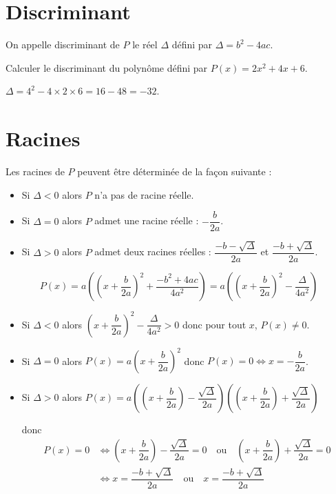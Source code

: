 \documentclass[french]{book}
\begin{document}
\section{Discriminant}
\begin{defn}
On appelle discriminant de $P$ le réel $\Delta$ défini par $\Delta=b^{2}-4ac$.
\vspace{5mm}
\end{defn}

\begin{exemple}
Calculer le discriminant du polynôme défini par $P(x)=2x^{2}+4x+6$.
\end{exemple}


$\Delta=4^{2}-4\times 2\times 6=16-48=-32$.


\section{Racines}
\begin{prop}
Les racines de $P$ peuvent être déterminée de la façon suivante :
\begin{itemize}
\item Si $\Delta<0$ alors $P$ n'a pas de racine réelle.
\item Si $\Delta=0$ alors $P$ admet une racine réelle : $-\dfrac{b}{2a}$.
\item Si $\Delta>0$ alors $P$ admet deux racines réelles : $\dfrac{-b-\sqrt{\Delta}}{2a}$ et $\dfrac{-b+\sqrt{\Delta}}{2a}$.
\end{itemize}
\end{prop}

\begin{demo}
\[P(x)=a\left(\left(x+\dfrac{b}{2a}\right)^{2}+\dfrac{-b^{2}+4ac}{4a^{2}}\right)=a\left(\left(x+\dfrac{b}{2a}\right)^{2}-\dfrac{\Delta}{4a^{2}}\right)\]
\begin{itemize}
\item Si $\Delta<0$ alors $\left(x+\dfrac{b}{2a}\right)^{2}-\dfrac{\Delta}{4a^{2}}>0$ donc pour tout $x$, $P(x)\neq0$.
\item Si $\Delta=0$ alors $P(x)=a\left(x+\dfrac{b}{2a}\right)^{2}$ donc $P(x)=0\Longleftrightarrow x=-\dfrac{b}{2a}$.
\item Si $\Delta>0$ alors $P(x)=a\left(\left(x+\dfrac{b}{2a}\right)-\dfrac{\sqrt{\Delta}}{2a}\right)\left(\left(x+\dfrac{b}{2a}\right)+\dfrac{\sqrt{\Delta}}{2a}\right)$

donc
\begin{align*}
P(x)=0&\Longleftrightarrow\left(x+\dfrac{b}{2a}\right)-\dfrac{\sqrt{\Delta}}{2a}=0 \quad \text{ou} \quad \left(x+\dfrac{b}{2a}\right)+\dfrac{\sqrt{\Delta}}{2a}=0\\
&\Longleftrightarrow x=\dfrac{-b+\sqrt{\Delta}}{2a} \quad \text{ou} \quad x=\dfrac{-b+\sqrt{\Delta}}{2a}
\end{align*}

\end{itemize}
\end{demo}
\end{document}

